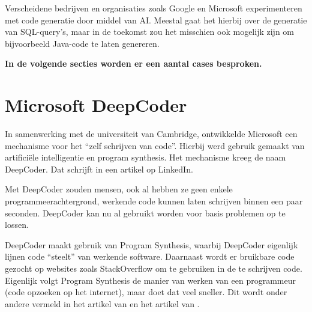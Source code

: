 Verscheidene bedrijven en organisaties zoals Google en Microsoft experimenteren met code generatie door middel van AI. Meestal gaat het hierbij over de generatie van SQL-query's, maar in de toekomst zou het misschien ook mogelijk zijn om bijvoorbeeld Java-code te laten genereren. 

\textbf{In de volgende secties worden er een aantal cases besproken.}
\section{Microsoft DeepCoder}

In samenwerking met de universiteit van Cambridge, ontwikkelde Microsoft een mechanisme voor het “zelf schrijven van code”. Hierbij werd gebruik gemaakt van artificiële intelligentie en program synthesis. Het mechanisme kreeg de naam DeepCoder. Dat schrijft \textcite{DeepCoder} in een artikel op LinkedIn.

Met DeepCoder zouden mensen, ook al hebben ze geen enkele programmeerachtergrond, werkende code kunnen laten schrijven binnen een paar seconden. DeepCoder kan nu al gebruikt worden voor basis problemen op te lossen.

DeepCoder maakt gebruik van Program Synthesis, waarbij DeepCoder eigenlijk lijnen code “steelt” van werkende software. Daarnaast wordt er bruikbare code gezocht op websites zoals StackOverflow om te gebruiken in de te schrijven code. Eigenlijk volgt Program Synthesis de manier van werken van een programmeur (code opzoeken op het internet), maar doet dat veel sneller. Dit wordt onder andere vermeld in het artikel van \textcite{techcrunch} en het artikel van \textcite{NewScientist}.

